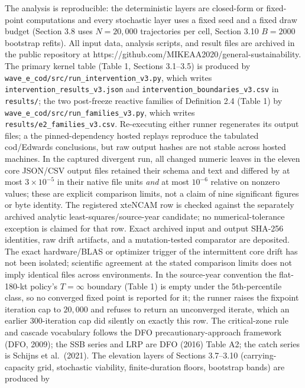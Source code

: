 \documentclass[11pt]{article}
\begin{document}
The analysis is reproducible: the deterministic layers are closed-form or
fixed-point computations and every stochastic layer uses a fixed seed and a
fixed draw budget (Section 3.8 uses \(N = 20{,}000\) trajectories per cell,
Section 3.10 \(B = 2000\) bootstrap refits). All input data, analysis
scripts, and result files are archived in the public repository at
https://github.com/MIKEAA2020/general-sustainability. The primary kernel
table (Table 1, Sections 3.1--3.5) is produced by
\texttt{wave\_e\_cod/src/run\_intervention\_v3.py}, which writes
\texttt{intervention\_results\_v3.json} and
\texttt{intervention\_boundaries\_v3.csv} in \texttt{results/}; the two post-freeze
reactive families of Definition 2.4 (Table 1) by
\texttt{wave\_e\_cod/src/\allowbreak{}run\_families\_v3.py}, which
writes
\texttt{results/e2\_families\_v3.csv}. Re-executing either runner
regenerates its output files; a
the pinned-dependency hosted replays reproduce the tabulated cod/Edwards
conclusions, but raw output hashes are not stable across hosted machines.
In the captured divergent run, all changed numeric leaves in the eleven core
JSON/CSV output files retained their schema and text and differed by at most
\(3\times10^{-5}\) in their native file units \emph{and} at most
\(10^{-6}\) relative on nonzero values; these are explicit comparison
limits, not a claim of nine significant figures or byte identity. The
registered xteNCAM row is checked against the separately archived analytic
least-squares/source-year candidate; no numerical-tolerance exception is
claimed for that row. Exact archived input and output SHA-256 identities,
raw drift artifacts, and a mutation-tested comparator are deposited.
The exact hardware/BLAS or optimizer trigger of the intermittent core drift
has not been isolated; scientific agreement at the stated comparison limits
does not imply identical files across environments. In the source-year convention the flat-180-kt policy's
\(T=\infty\) boundary (Table 1) is empty under the 5th-percentile class,
so no converged fixed point is reported for it; the runner raises the
fixpoint iteration cap to \(20{,}000\) and refuses to return an
unconverged iterate, which an earlier \(300\)-iteration cap did silently
on exactly this row. The critical-zone
rule and cascade vocabulary follows the DFO precautionary-approach
framework (DFO, 2009); the SSB series and LRP are DFO (2016) Table A2;
the catch series is Schijns et al.~(2021). The elevation layers of
Sections 3.7--3.10 (carrying-capacity grid, stochastic viability,
finite-duration floors, bootstrap bands) are produced by
\end{document}
